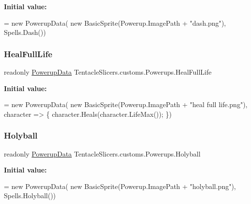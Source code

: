 {\bfseries Initial value\+:}
\begin{DoxyCode}
= \textcolor{keyword}{new} PowerupData(
            \textcolor{keyword}{new} BasicSprite(Powerup.ImagePath + \textcolor{stringliteral}{"dash.png"}), Spells.Dash())
\end{DoxyCode}
\mbox{\label{class_tentacle_slicers_1_1customs_1_1_powerups_a68603bf59297b6beddc937004b9aa164}} 
\subsubsection{\texorpdfstring{Heal\+Full\+Life}{HealFullLife}}
{\footnotesize\ttfamily readonly \hyperlink{class_tentacle_slicers_1_1actors_1_1_powerup_data}{Powerup\+Data} Tentacle\+Slicers.\+customs.\+Powerups.\+Heal\+Full\+Life\hspace{0.3cm}{\ttfamily [static]}}

{\bfseries Initial value\+:}
\begin{DoxyCode}
= \textcolor{keyword}{new} PowerupData(
            \textcolor{keyword}{new} BasicSprite(Powerup.ImagePath + \textcolor{stringliteral}{"heal full life.png"}), character =>
            \{
                character.Heals(character.LifeMax());
            \})
\end{DoxyCode}
\mbox{\label{class_tentacle_slicers_1_1customs_1_1_powerups_ab329ffe6cbfba86eec8ef470a85f5c4b}} 
\subsubsection{\texorpdfstring{Holyball}{Holyball}}
{\footnotesize\ttfamily readonly \hyperlink{class_tentacle_slicers_1_1actors_1_1_powerup_data}{Powerup\+Data} Tentacle\+Slicers.\+customs.\+Powerups.\+Holyball\hspace{0.3cm}{\ttfamily [static]}}

{\bfseries Initial value\+:}
\begin{DoxyCode}
= \textcolor{keyword}{new} PowerupData(
            \textcolor{keyword}{new} BasicSprite(Powerup.ImagePath + \textcolor{stringliteral}{"holyball.png"}), Spells.Holyball())
\end{DoxyCode}
\mbox{\label{class_tentacle_slicers_1_1customs_1_1_powerups_af56c0bc7f099319f3869f7ceb394677a}} 
